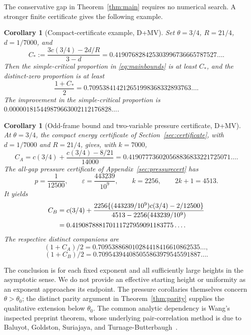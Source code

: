 ﻿\documentclass[11pt]{article}
\newtheorem{corollary}[theorem]{Corollary}
\theoremstyle{remark}
\begin{document}
The conservative gap in Theorem~\ref{thm:main} requires no numerical
search. A stronger finite certificate gives the following example.

\begin{corollary}[Compact-certificate example, D+MV]\label{cor:example}
Set $\theta=3/4$, $R=21/4$, $d=1/7000$, and
\[
 C_*:=\frac{3c(3/4)-2d/R}{3-d}
 =0.419076828425303996736665787527\ldots.
\]
Then the simple-critical proportion in \eqref{eq:mainbounds} is at least
$C_*$, and the distinct-zero proportion is at least
\[
 \frac{1+C_*}2=0.709538414212651998368332893763\ldots.
\]
The improvement in the simple-critical proportion is
$0.000001815449879663002112176828\ldots$.
\end{corollary}

\begin{corollary}[Odd-frame bound and two-variable pressure certificate, D+MV]\label{cor:pressureexample}
At $\theta=3/4$, the compact energy certificate of
Section~\ref{sec:certificate}, with $d=1/7000$ and $R=21/4$, gives, with
$k=7000$,
\begin{equation}\label{eq:reuseexample}
 C_A=c(3/4)+\frac{c(3/4)-8/21}{14000}
 =0.419077736020568836833221725071\ldots.
\end{equation}
The all-gap pressure certificate of Appendix~\ref{sec:pressurecert} has
\begin{equation}\label{eq:newparams}
 p=\frac1{12500},\qquad\varepsilon=\frac{443239}{10^9},
 \qquad k=2256,\qquad 2k+1=4513.
\end{equation}
It yields
\begin{align}\label{eq:newexample}
 C_B&=c(3/4)+\frac{2256\{(443239/10^9)c(3/4)-2/12500\}}
                         {4513-2256(443239/10^9)}\notag\\
 &=0.419087888170111727959091183775\ldots.
\end{align}
The respective distinct companions are
\[
 (1+C_A)/2=0.709538868010284418416610862535\ldots,
\]
\[
 (1+C_B)/2=0.709543944085055863979545591887\ldots.
\]
\end{corollary}

The conclusion is for each fixed exponent and all sufficiently large
heights in the asymptotic sense. We do not provide an effective starting
height or uniformity as an exponent approaches its endpoint. The pressure
corollaries themselves concern $\theta>\theta_0$; the distinct parity
argument in Theorem~\ref{thm:parity} supplies the qualitative extension
below $\theta_0$. The common analytic dependency
is Wang's inspected preprint theorem, whose underlying pair-correlation
method is due to Baluyot, Goldston, Suriajaya, and
Turnage-Butterbaugh~\cite{BGSTB,BGSTBcorrection}.
\end{document}
